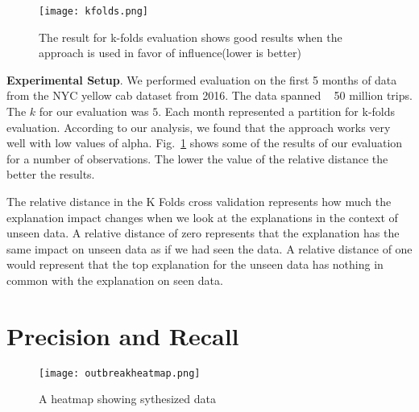 \begin{figure}[h]
\texttt{[image: kfolds.png]}
\caption{The result for k-folds evaluation shows good results when the approach is used in favor of influence(lower is better)}
\label{fig:kfolds}
\end{figure}

\textbf{Experimental Setup}. We performed evaluation on the first 5 months of data from the NYC yellow cab dataset from 2016. The data spanned ~ 50 million trips. The $k$ for our evaluation was $5$. Each month represented a partition for k-folds evaluation. According to our analysis, we found that the approach works very well with low values of alpha. Fig.~\ref{fig:kfolds} shows some of the results of our evaluation for a number of observations. The lower the value of the relative distance the better the results.

The relative distance in the K Folds cross validation represents how much the explanation impact changes when we look at the explanations in the context of unseen data. A relative distance of zero represents that the explanation has the same impact on unseen data as if we had seen the data. A relative distance of one would represent that the top explanation for the unseen data has nothing in common with the explanation on seen data.

\section{Precision and Recall}
\begin{wrapfigure}{r}{0.5\textwidth}
  \begin{center}
    \texttt{[image: outbreakheatmap.png]}
  \end{center}
  \caption{A heatmap showing sythesized data}
  \label{fig:synthesized_data}
\end{wrapfigure}


